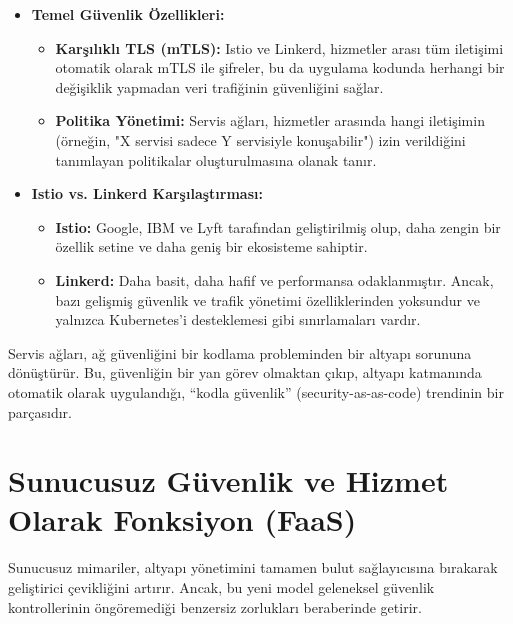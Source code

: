 \begin{itemize}
    \item \textbf{Temel Güvenlik Özellikleri:}
    \begin{itemize}
        \item \textbf{Karşılıklı TLS (mTLS):} Istio ve Linkerd, hizmetler arası tüm iletişimi otomatik olarak mTLS ile şifreler, bu da uygulama kodunda herhangi bir değişiklik yapmadan veri trafiğinin güvenliğini sağlar.
        \item \textbf{Politika Yönetimi:} Servis ağları, hizmetler arasında hangi iletişimin (örneğin, "X servisi sadece Y servisiyle konuşabilir") izin verildiğini tanımlayan politikalar oluşturulmasına olanak tanır.
    \end{itemize}
    \item \textbf{Istio vs. Linkerd Karşılaştırması:}
    \begin{itemize}
        \item \textbf{Istio:} Google, IBM ve Lyft tarafından geliştirilmiş olup, daha zengin bir özellik setine ve daha geniş bir ekosisteme sahiptir.
        \item \textbf{Linkerd:} Daha basit, daha hafif ve performansa odaklanmıştır. Ancak, bazı gelişmiş güvenlik ve trafik yönetimi özelliklerinden yoksundur ve yalnızca Kubernetes'i desteklemesi gibi sınırlamaları vardır.
    \end{itemize}
\end{itemize}
Servis ağları, ağ güvenliğini bir kodlama probleminden bir altyapı sorununa dönüştürür. Bu, güvenliğin bir yan görev olmaktan çıkıp, altyapı katmanında otomatik olarak uygulandığı, “kodla güvenlik” (security-as-as-code) trendinin bir parçasıdır.

\section{Sunucusuz Güvenlik ve Hizmet Olarak Fonksiyon (FaaS)}
Sunucusuz mimariler, altyapı yönetimini tamamen bulut sağlayıcısına bırakarak geliştirici çevikliğini artırır. Ancak, bu yeni model geleneksel güvenlik kontrollerinin öngöremediği benzersiz zorlukları beraberinde getirir.

